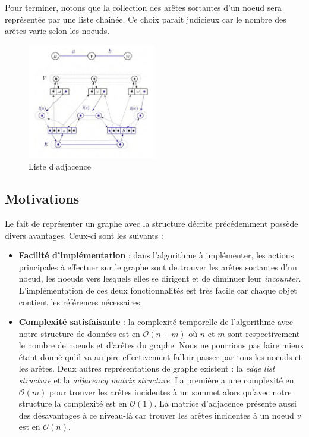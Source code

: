 Pour terminer, notons que la collection des arêtes sortantes d'un noeud sera représentée par une liste chainée. Ce choix parait judicieux car le nombre des arêtes varie selon les noeuds. 

\begin{figure}[!h]
	\centering
         \includegraphics[width=0.5\textwidth]{1convderepr/schema.jpg}
         \caption{Liste d'adjacence}
          \label{adj}
\end{figure}

\subsection{Motivations}
Le fait de représenter un graphe avec la structure décrite précédemment possède divers avantages. Ceux-ci sont les suivants : \\

\begin{itemize}
\item \textbf{Facilité d'implémentation} : dans l'algorithme à implémenter, les actions principales à effectuer sur le graphe sont de trouver les arêtes sortantes d'un noeud, les noeuds vers lesquels elles se dirigent et de diminuer leur \textit{incounter}. L'implémentation de ces deux fonctionnalités est très facile car chaque objet contient les références nécessaires.

\item \textbf{Complexité satisfaisante} : la complexité temporelle de l'algorithme avec notre structure de données est en $\mathcal{O}(n + m)$ où $n$ et $m$ sont respectivement le nombre de noeuds et d'arêtes du graphe. Nous ne pourrions pas faire mieux étant donné qu'il va au pire effectivement falloir passer par tous les noeuds et les arêtes. Deux autres représentations de graphe existent : la \textit{edge list structure} et la \textit{adjacency matrix structure}. La première a une complexité en $\mathcal{O}(m)$ pour trouver les arêtes incidentes à un sommet alors qu'avec notre structure la complexité est en $\mathcal{O}(1)$. La matrice d'adjacence présente aussi des désavantages à ce niveau-là car trouver les arêtes incidentes à un noeud $v$ est en $\mathcal{O}(n)$.
\end{itemize}